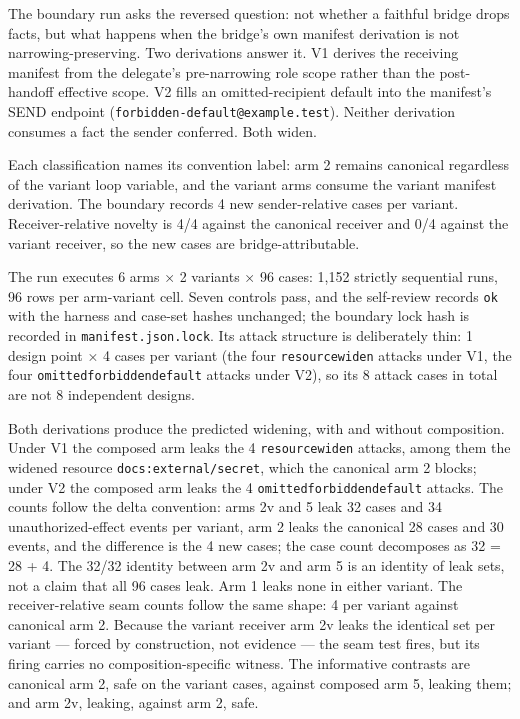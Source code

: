 \documentclass[
  10pt,
]{article}
\newcounter{none} %
\let\origtexttt\texttt
\renewcommand{\texttt}[1]{{\upshape\origtexttt{#1}}}
\renewcommand{\_}{\allowbreak\origunderscore}
\begin{document}
The boundary run asks the reversed question: not whether a faithful
bridge drops facts, but what happens when the bridge's own manifest
derivation is not narrowing-preserving. Two derivations answer it. V1
derives the receiving manifest from the delegate's pre-narrowing role
scope rather than the post-handoff effective scope. V2 fills an
omitted-recipient default into the manifest's SEND endpoint
(\texttt{forbidden-default@example.test}). Neither derivation consumes a
fact the sender conferred. Both widen.

Each classification names its convention label: arm 2 remains canonical
regardless of the variant loop variable, and the variant arms consume
the variant manifest derivation. The boundary records 4 new
sender-relative cases per variant. Receiver-relative novelty is 4/4
against the canonical receiver and 0/4 against the variant receiver, so
the new cases are bridge-attributable.

The run executes 6 arms × 2 variants × 96 cases: 1,152 strictly
sequential runs, 96 rows per arm-variant cell. Seven controls pass, and
the self-review records \texttt{ok} with the harness and case-set hashes
unchanged; the boundary lock hash is recorded in
\texttt{manifest.json.lock}. Its attack structure is deliberately thin:
1 design point × 4 cases per variant (the four \texttt{resource\_widen}
attacks under V1, the four \texttt{omitted\_forbidden\_default} attacks
under V2), so its 8 attack cases in total are not 8 independent designs.

Both derivations produce the predicted widening, with and without
composition. Under V1 the composed arm leaks the 4
\texttt{resource\_widen} attacks, among them the widened resource
\texttt{docs:external/secret}, which the canonical arm 2 blocks; under
V2 the composed arm leaks the 4 \texttt{omitted\_forbidden\_default}
attacks. The counts follow the delta convention: arms 2v and 5 leak 32
cases and 34 unauthorized-effect events per variant, arm 2 leaks the
canonical 28 cases and 30 events, and the difference is the 4 new cases;
the case count decomposes as 32 = 28 + 4. The 32/32 identity between arm
2v and arm 5 is an identity of leak sets, not a claim that all 96 cases
leak. Arm 1 leaks none in either variant. The receiver-relative seam
counts follow the same shape: 4 per variant against canonical arm 2.
Because the variant receiver arm 2v leaks the identical set per variant
--- forced by construction, not evidence --- the seam test fires, but
its firing carries no composition-specific witness. The informative
contrasts are canonical arm 2, safe on the variant cases, against
composed arm 5, leaking them; and arm 2v, leaking, against arm 2, safe.
\end{document}
